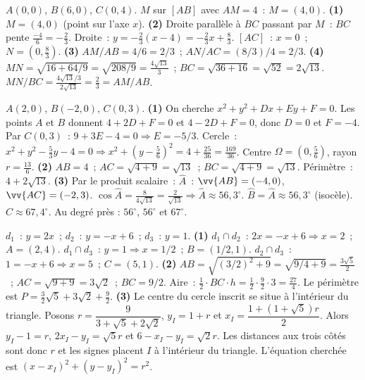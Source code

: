 
$A(0,0)$, $B(6,0)$, $C(0,4)$. $M$ sur $[AB]$ avec $AM=4$~: $M=(4,0)$.
\textbf{(1)} $M=(4,0)$ (point sur l'axe $x$).
\textbf{(2)} Droite parall\`ele \`a $BC$ passant par $M$~: $BC$ pente $\frac{-4}{6}=-\frac{2}{3}$.
Droite~: $y=-\frac{2}{3}(x-4)=-\frac{2}{3}x+\frac{8}{3}$.
$[AC]$~: $x=0$~; $N=(0,\frac{8}{3})$.
\textbf{(3)} $AM/AB=4/6=2/3$~; $AN/AC=(8/3)/4=2/3$.\checkmark
\textbf{(4)} $MN=\sqrt{16+64/9}=\sqrt{208/9}=\frac{4\sqrt{13}}{3}$~; $BC=\sqrt{36+16}=\sqrt{52}=2\sqrt{13}$.
$MN/BC=\frac{4\sqrt{13}/3}{2\sqrt{13}}=\frac{2}{3}=AM/AB$.\checkmark


$A(2,0)$, $B(-2,0)$, $C(0,3)$.
\textbf{(1)} On cherche $x^2+y^2+Dx+Ey+F=0$.
Les points $A$ et $B$ donnent $4+2D+F=0$ et $4-2D+F=0$,
donc $D=0$ et $F=-4$.
Par $C(0,3)$~: $9+3E-4=0\Rightarrow E=-5/3$.
Cercle~: $x^2+y^2-\frac{5}{3}y-4=0\Rightarrow x^2+(y-\frac{5}{6})^2=4+\frac{25}{36}=\frac{169}{36}$.
Centre $\Omega=(0,\frac{5}{6})$, rayon $r=\frac{13}{6}$.
\textbf{(2)} $AB=4$~; $AC=\sqrt{4+9}=\sqrt{13}$~; $BC=\sqrt{4+9}=\sqrt{13}$. P\'erim\`etre~: $4+2\sqrt{13}$.
\textbf{(3)} Par le produit scalaire~: $\hat{A}$~: $\vv{AB}=(-4,0)$, $\vv{AC}=(-2,3)$.
$\cos\hat{A}=\frac{8}{4\sqrt{13}}=\frac{2}{\sqrt{13}}\Rightarrow\hat{A}\approx56{,}3^{\circ}$.
$\hat{B}=\hat{A}\approx56{,}3^{\circ}$ (isoc\`ele). $\hat{C}\approx67{,}4^{\circ}$.
Au degr\'e pr\`es : $56^{\circ}$, $56^{\circ}$ et $67^{\circ}$.


$d_1$~: $y=2x$~; $d_2$~: $y=-x+6$~; $d_3$~: $y=1$.
\textbf{(1)} $d_1\cap d_2$~: $2x=-x+6\Rightarrow x=2$~; $A=(2,4)$.
$d_1\cap d_3$~: $y=1\Rightarrow x=1/2$~; $B=(1/2,1)$.
$d_2\cap d_3$~: $1=-x+6\Rightarrow x=5$~; $C=(5,1)$.
\textbf{(2)} $AB=\sqrt{(3/2)^2+9}=\sqrt{9/4+9}=\frac{3\sqrt{5}}{2}$~;
$AC=\sqrt{9+9}=3\sqrt{2}$~; $BC=9/2$.
Aire~: $\frac{1}{2}\cdot BC\cdot h=\frac{1}{2}\cdot\frac{9}{2}\cdot3=\frac{27}{4}$.
Le p\'erim\`etre est $P=\frac32\sqrt5+3\sqrt2+\frac92$.
\textbf{(3)} Le centre du cercle inscrit se situe \`a l'int\'erieur du triangle.
Posons $r=\dfrac{9}{3+\sqrt5+2\sqrt2}$, $y_I=1+r$ et
$x_I=\dfrac{1+(1+\sqrt5)r}{2}$.
Alors $y_I-1=r$, $2x_I-y_I=\sqrt5r$ et $6-x_I-y_I=\sqrt2r$.
Les distances aux trois c\^ot\'es sont donc $r$ et les signes placent $I$
\`a l'int\'erieur du triangle. L'\'equation cherch\'ee est
$(x-x_I)^2+(y-y_I)^2=r^2$.

